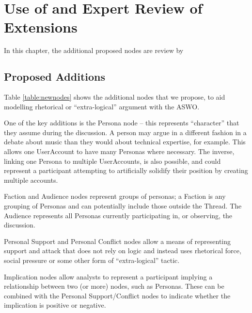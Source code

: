 \chapter{Use of and Expert Review of Extensions}
\label{expert}

\newcommand{\imageScale}{0.55}
\newcommand{\nodeScale}{0.95}

\newcommand{\simon}{A }
\newcommand{\jodi}{B }
\newcommand{\bob}{C }
\newcommand{\lizzy}{D }
\newcommand{\ash}{E }
\newcommand{\chris}{F }

In this chapter, the additional proposed nodes are review by 

\section{Proposed Additions}

Table \ref{table:newnodes} shows the additional nodes that we propose, to aid modelling rhetorical or ``extra-logical'' argument with the ASWO.

One of the key additions is the Persona node -- this represents ``character'' that they assume during the discussion. A person may argue in a different fashion in a debate about music than they would about technical expertise, for example. This allows one UserAccount to have many Personas where necessary. The inverse, linking one Persona to multiple UserAccounts, is also possible, and could represent a participant attempting to artificially solidify their position by creating multiple accounts.

Faction and Audience nodes represent groups of personas; a Faction is any grouping of Personas and can potentially include those outside the Thread. The Audience represents all Personas currently participating in, or observing, the discussion.

Personal Support and Personal Conflict nodes allow a means of representing support and attack that does not rely on logic and instead uses rhetorical force, social pressure or some other form of ``extra-logical'' tactic.

Implication nodes allow analysts to represent a participant implying a relationship between two (or more) nodes, such as Personas. These can be combined with the Personal Support/Conflict nodes to indicate whether the implication is positive or negative.


